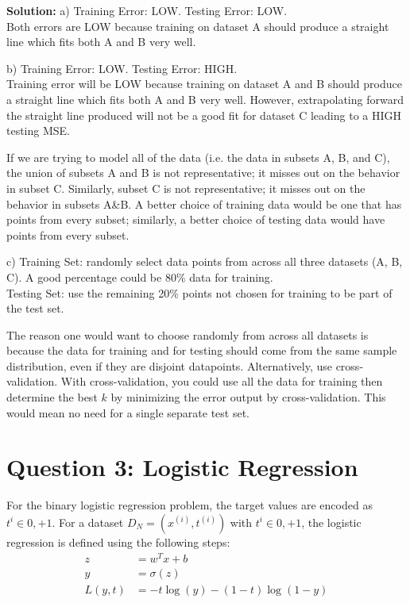\documentclass[12pt]{article}
\begin{document}
	\begin{framed}
		\textbf{Solution: }
		a) Training Error: LOW. Testing Error: LOW.\\
		Both errors are LOW because training on dataset A should produce a straight line which fits both A and B very well. 
		
		b) Training Error: LOW. Testing Error: HIGH. \\
		Training error will be LOW because training on dataset A and B should produce a straight line which fits both A and B very well. However, extrapolating forward the straight line produced will not be a good fit for dataset C leading to a HIGH testing MSE.
		
	 	If we are trying to model all of the data (i.e. the data in subsets A, B, and C), the union of subsets A and B is not representative; it misses out on the behavior in subset C. Similarly, subset C is not representative; it misses out on the behavior in subsets A\&B. A better choice of training data would be one that has points from every subset; similarly, a better choice of testing data would have points from every subset.
		
		c) Training Set: randomly select data points from across all three datasets (A, B, C). A good percentage could be 80\% data for training.\\
		Testing Set: use the remaining 20\% points not chosen for training to be part of the test set.
		
		The reason one would want to choose randomly from across all datasets is because the data for training and for testing should come from the same sample distribution, even if they are disjoint datapoints. Alternatively, use cross-validation. With cross-validation, you could use all the data for training then determine the best $k$ by minimizing the error output by cross-validation. This would mean no need for a single separate test set.
	\end{framed}

	\section*{Question 3: Logistic Regression}
	For the binary logistic regression problem, the target values are encoded as $t^i \in {0,+1}$.
	For a dataset $D_N = {(x^{(i)}, t^{(i)})}$ with $t^i \in {0,+1}$, the logistic regression is defined using the following steps:
	\begin{align}
		z &= w^Tx + b \\
		y &= \sigma(z) \\
		L(y,t) &= -t\log(y) - (1-t) \log (1-y)
	\end{align}
	
\end{document}
